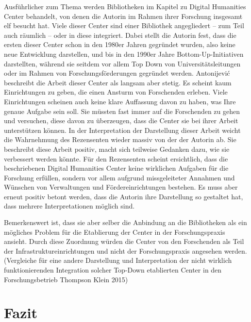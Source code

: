 \documentclass[a4paper,
fontsize=11pt,
oneside,
numbers=noperiodatend,
parskip=half-,
bibliography=totoc,
final
]{scrartcl}
\begin{document}
Ausführlicher zum Thema werden Bibliotheken im Kapitel zu Digital
Humanities Center behandelt, von denen die Autorin im Rahmen ihrer
Forschung insgesamt elf besucht hat. Viele dieser Center sind einer
Bibliothek angegliedert -- zum Teil auch räumlich -- oder in diese
integriert. Dabei stellt die Autorin fest, dass die ersten dieser Center
schon in den 1980er Jahren gegründet wurden, also keine neue Entwicklung
darstellen, und bis in den 1990er Jahre Bottom-Up-Initiativen
darstellten, während sie seitdem vor allem Top Down von
Universitätsleitungen oder im Rahmen von Forschungsförderungen gegründet
werden. Antonijević beschreibt die Arbeit dieser Center als langsam aber
stetig. Es scheint kaum Einrichtungen zu geben, die einen Ansturm von
Forschenden erleben. Viele Einrichtungen scheinen auch keine klare
Auffassung davon zu haben, was Ihre genaue Aufgabe sein soll. Sie
müssten fast immer auf die Forschenden zu gehen und versuchen, diese
davon zu überzeugen, dass die Center sie bei ihrer Arbeit unterstützen
können. In der Interpretation der Darstellung dieser Arbeit weicht die
Wahrnehmung des Rezensenten wieder massiv von der der Autorin ab. Sie
beschreibt diese Arbeit positiv, macht sich teilweise Gedanken dazu, wie
sie verbessert werden könnte. Für den Rezensenten scheint ersichtlich,
dass die beschriebenen Digital Humanities Center keine wirklichen
Aufgaben für die Forschung erfüllen, sondern vor allem aufgrund
missgeleiteter Annahmen und Wünschen von Verwaltungen und
Fördereinrichtungen bestehen. Es muss aber erneut positiv betont werden,
dass die Autorin ihre Darstellung so gestaltet hat, dass mehrere
Interpretationen möglich sind.

Bemerkenswert ist, dass sie aber selber die Anbindung an die
Bibliotheken als ein mögliches Problem für die Etablierung der Center in
der Forschungspraxis ansieht. Durch diese Zuordnung würden die Center
von den Forschenden als Teil der Infrastruktureinrichtungen und nicht
der Forschungspraxis angesehen werden. (Vergleiche für eine andere
Darstellung und Interpretation der nicht wirklich funktionierenden
Integration solcher Top-Down etablierten Center in den Forschungsbetrieb
Thompson Klein 2015)

\section*{Fazit}\label{fazit}
\end{document}
